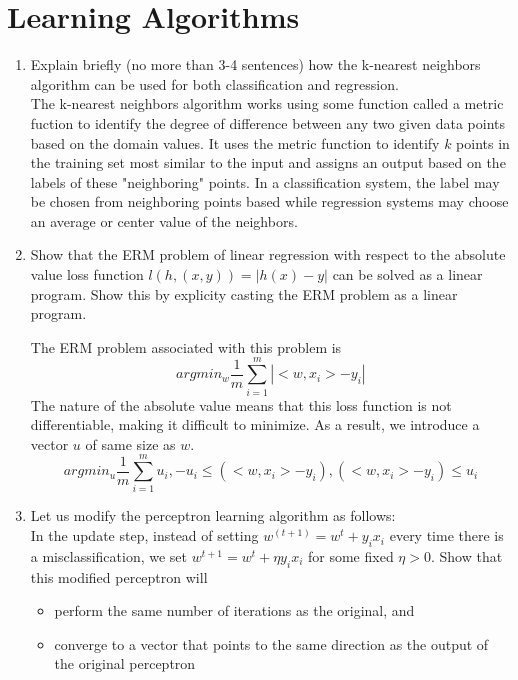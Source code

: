 \documentclass[12pt]{article}
\begin{document}
\section{Learning Algorithms}
\begin{enumerate}
    \item Explain briefly (no more than 3-4 sentences) how the k-nearest neighbors algorithm can be used for both classification and regression.\\
    The k-nearest neighbors algorithm works using some function called a metric fuction to identify the degree of difference between any two given data points based on the domain values. It uses the metric function to identify $k$ points in the training set most similar to the input and assigns an output based on the labels of these "neighboring" points. In a classification system, the label may be chosen from neighboring points based while regression systems may choose an average or center value of the neighbors.
    \item Show that the ERM problem of linear regression with respect to the absolute value loss function $l(h,(x,y))=|h(x)-y|$ can be solved as a linear program. Show this by explicity casting the ERM problem as a linear program.

    The ERM problem associated with this problem is $$argmin_w \frac{1}{m}\sum^m_{i=1}|<w,x_i>-y_i|$$
    The nature of the absolute value means that this loss function is not differentiable, making it difficult to minimize. As a result, we introduce a vector $u$ of same size as $w$.
    $$argmin_u \frac{1}{m}\sum^m_{i=1}u_i, -u_i\leq (<w,x_i>-y_i), (<w,x_i>-y_i)\leq u_i$$

    \item Let us modify the perceptron learning algorithm as follows:\\
    In the update step, instead of setting $w^{(t+1)}=w^t+y_ix_i$ every time there is a misclassification, we set $w^{t+1}=w^t+\eta y_ix_i$ for some fixed $\eta > 0$. Show that this modified perceptron will
    \begin{itemize}
        \item perform the same number of iterations as the original, and
        \item converge to a vector that points to the same direction as the output of the original perceptron
    \end{itemize}


\end{enumerate}
\end{document}
